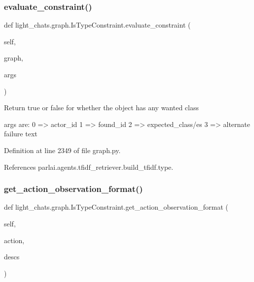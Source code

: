 \subsubsection{\texorpdfstring{evaluate\+\_\+constraint()}{evaluate\_constraint()}}
{\footnotesize\ttfamily def light\+\_\+chats.\+graph.\+Is\+Type\+Constraint.\+evaluate\+\_\+constraint (\begin{DoxyParamCaption}\item[{}]{self,  }\item[{}]{graph,  }\item[{}]{args }\end{DoxyParamCaption})}

\begin{DoxyVerb}Return true or false for whether the object has any wanted class

args are:
    0 => actor_id
    1 => found_id
    2 => expected_class/es
    3 => alternate failure text
\end{DoxyVerb}
 

Definition at line 2349 of file graph.\+py.



References parlai.\+agents.\+tfidf\+\_\+retriever.\+build\+\_\+tfidf.\+type.

\mbox{\label{classlight__chats_1_1graph_1_1IsTypeConstraint_a1443cca8a343b530929093446b1b914f}} 
\subsubsection{\texorpdfstring{get\+\_\+action\+\_\+observation\+\_\+format()}{get\_action\_observation\_format()}}
{\footnotesize\ttfamily def light\+\_\+chats.\+graph.\+Is\+Type\+Constraint.\+get\+\_\+action\+\_\+observation\+\_\+format (\begin{DoxyParamCaption}\item[{}]{self,  }\item[{}]{action,  }\item[{}]{descs }\end{DoxyParamCaption})}



